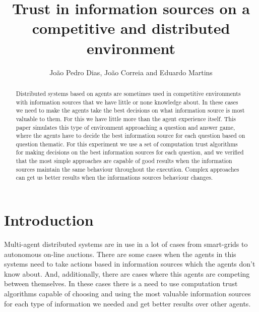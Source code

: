 \documentclass{llncs}
\begin{document}
\title{Trust in information sources on a competitive and distributed environment}
\author{João Pedro Dias, João Correia and Eduardo Martins}

\maketitle

\begin{abstract}

Distributed systems based on agents are sometimes used in competitive environments with information sources that we have little or none knowledge about. In these cases we need to make the agents take the best decisions on what information source is most valuable to them. For this we have little more than the agent experience itself. This paper simulates this type of environment approaching a question and answer game, where the agents have to decide the best information source for each question based on question thematic. For this experiment we use a set of computation trust algorithms for making decisions on the best information sources for each question, and we verified that the most simple approaches are capable of good results when the information sources maintain the same behaviour throughout the execution. Complex approaches can get us better results when the informations sources behaviour changes.

\end{abstract}

\section{Introduction}\label{sec:Introduction}

Multi-agent distributed systems are in use in a lot of cases from smart-grids\cite{intro} to autonomous on-line auctions\cite{introtwo}. There are some cases when the agents in this systems need to take actions based in information sources which the agents don't know about. And, additionally, there are cases where this agents are competing between themselves. In these cases there is a need to use computation trust algorithms capable of choosing and using the most valuable information sources for each type of information we needed and get better results over other agents.
\end{document}
